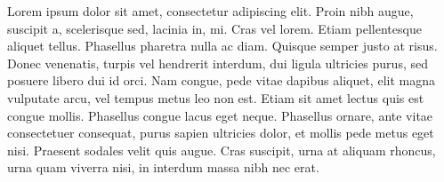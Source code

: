 \documentclass[12pt,a4paper,oneside]{book}
\begin{document}
  Lorem ipsum dolor sit amet, consectetur adipiscing elit. Proin nibh augue, suscipit a, scelerisque sed, lacinia in, mi. Cras vel lorem. Etiam pellentesque aliquet tellus. Phasellus pharetra nulla ac diam. Quisque semper justo at risus. Donec venenatis, turpis vel hendrerit interdum, dui ligula ultricies purus, sed posuere libero dui id orci. Nam congue, pede vitae dapibus aliquet, elit magna vulputate arcu, vel tempus metus leo non est. Etiam sit amet lectus quis est congue mollis. Phasellus congue lacus eget neque. Phasellus ornare, ante vitae consectetuer consequat, purus sapien ultricies dolor, et mollis pede metus eget nisi. Praesent sodales velit quis augue. Cras suscipit, urna at aliquam rhoncus, urna quam viverra nisi, in interdum massa nibh nec erat.


\newpage

 

\end{document}
